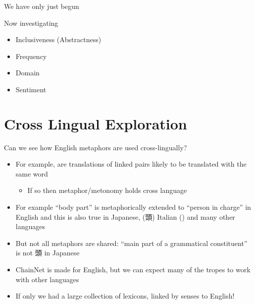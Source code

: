 \documentclass[xetex]{beamer}  %
\begin{document}
\begin{frame}{We have only just begun}

Now investigating
  \begin{itemize}
\item Inclusiveness (Abstractness)
\item Frequency
\item Domain
\item Sentiment
\end{itemize}
\end{frame}
\section{Cross Lingual Exploration}
\begin{frame}{Can we see how English metaphors are used cross-lingually?}
  \begin{itemize}
  \item For example, are translations of linked pairs likely to be
    translated with the same word
    \begin{itemize}
    \item If so then metaphor/metonomy holds cross language
    \end{itemize}
  \item For example  ``body part'' is metaphorically
    extended to ``person in charge'' in English and this is also true in Japanese,
    (頭) Italian () and many other languages
  \item But not all metaphors are shared:   ``main part of a grammatical constituent'' is not 頭 in Japanese
    \bigskip
  \item ChainNet is made for English, but we can expect many of the
    tropes to work with other languages
  \item If only we had a large collection of lexicons, linked by senses to English!
    

  \end{itemize}
\end{frame}
\end{document}

